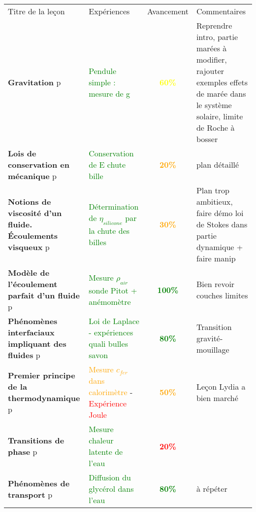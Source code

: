 \begin{changemargin}{-1.5cm}{-0cm}

\begin{center}
\begin{tabularx}{\paperwidth-2cm}{| X | X | c | X |}
  \hline
  \rowcolor{gray!20}\multicolumn{4}{c}{Avancement préparation oraux Leçons Physique} \\
  \hline 
  Titre de la leçon & Expériences & Avancement & Commentaires \\
  \hline
\textbf{Gravitation} p\pageref{LP_Gravitation}  & \textcolor{green}{Pendule simple : mesure de g} & \textcolor{yellow}{\textbf{60\%}}  & Reprendre intro, partie marées à modifier, rajouter exemples effets de marée dans le système solaire, limite de Roche à bosser  \\
  \hline 
  \hline
     \textbf{Lois de conservation en mécanique} p\pageref{LP_LoisConservation} & \textcolor{green}{Conservation de E chute bille} & \textcolor{orange}{\textbf{20\%}} & plan détaillé \\
  \hline 
    \textbf{Notions de viscosité d'un fluide. \'{E}coulements visqueux} p\pageref{LP_Viscosite} & \textcolor{green}{Détermination de $\eta_{silicone}$ par la chute des billes}  & \textcolor{orange}{\textbf{30\%}} & Plan trop ambitieux, faire démo loi de Stokes dans partie dynamique + faire manip \\
  \hline 
  \textbf{Modèle de l'écoulement parfait d'un fluide} p\pageref{LP_EcoulementParfait} & \textcolor{green}{Mesure $\rho_{air}$ sonde Pitot + anémomètre} & \textcolor{green}{\textbf{100\%}} & Bien revoir couches limites \\
  \hline
  \textbf{Phénomènes interfaciaux impliquant des fluides} p\pageref{LP_PhenomenesInterfaciaux} & \textcolor{green}{Loi de Laplace - expériences quali bulles savon }& \textcolor{green}{\textbf{80\%}} & Transition gravité-mouillage \\
  \hline 
  \hline
  \textbf{Premier principe de la thermodynamique} p\pageref{LP_PremierPrincipe} & \textcolor{orange}{Mesure $c_{fer}$ dans calorimètre} - \textcolor{red}{Expérience Joule} & \textcolor{orange}{\textbf{50\%}} & Leçon Lydia a bien marché \\
  \hline 
  \textbf{Transitions de phase} p\pageref{LP_TransitionPhase} & \textcolor{green}{Mesure chaleur latente de l'eau} & \textcolor{red}{\textbf{20\%}} & \\
  \hline 
  \textbf{Phénomènes de transport} p\pageref{LP_Transport} & \textcolor{green}{Diffusion du glycérol dans l'eau} & \textcolor{green}{\textbf{80\%}} & à répéter\\

\end{tabularx}
\end{center}
\end{changemargin}
